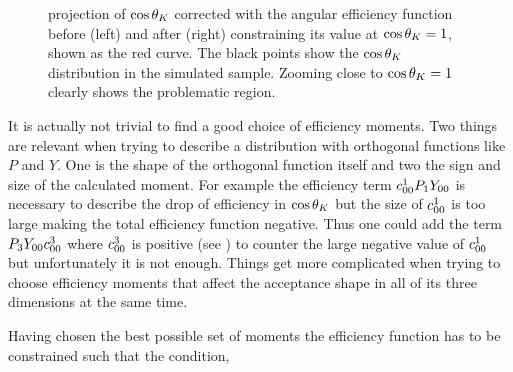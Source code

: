\begin{figure}[t]
  \centering
  \begin{subfigure}{0.5\textwidth}
    \raggedright
    \scalebox{1.15}{}
    \caption{}
    \label{angAcc_nom}
  \end{subfigure}%
  \hfill%
  \begin{subfigure}{0.5\textwidth}
    \raggedleft
    \scalebox{1.15}{}
    \caption{}
    \label{angAcc_constr_fit}
  \end{subfigure}
  \caption{\pdf projection of $\cos\theta_{K}$ corrected with the angular efficiency function before (left) and after (right)
           constraining its value at $\cos\theta_{K}=1$, shown as the red curve. The black points show the $\cos\theta_{K}$
           distribution in the simulated sample. Zooming close to $\cos\theta_{K}=1$ clearly shows the problematic region.}
  \label{angAcc_constr}
\end{figure}

It is actually not trivial to find a good choice of efficiency moments. Two things are relevant when trying to describe a
distribution with orthogonal functions like $P$ and $Y$. One is the shape of the orthogonal function itself and two the sign and size of the calculated moment.
For example the efficiency term $c^{1}_{00} P_1Y_{00}$ is necessary to describe the drop of efficiency in $\cos\theta_{K}$ but the size of $c^{1}_{00}$
is too large making the total efficiency function negative. Thus one could add the term $P_3Y_{00}c^{3}_{00}$ where $c^{3}_{00}$ is positive
(see  ) to counter the large negative value of $c^{1}_{00}$ but unfortunately it is not enough. Things get more complicated
when trying to choose efficiency moments that affect the acceptance shape in all of its three dimensions at the same time.

Having chosen the best possible set of moments the efficiency function has to be constrained such that the condition,

